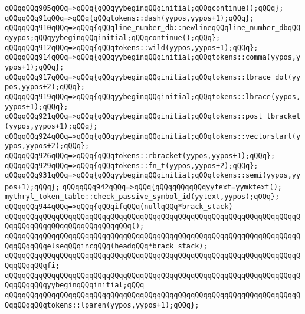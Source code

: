 \verb|qQQqqQQq905qQQq=>qQQq{qQQqyybeginqQQqinitial;qQQqcontinue();qQQq};|\newline
\verb|qQQqqQQq91qQQq=>qQQq{qQQqtokens::dash(yypos,yypos+1);qQQq};|\newline
\verb|qQQqqQQq910qQQq=>qQQq{qQQqline_number_db::newlineqQQqline_number_dbqQQqyypos;qQQqyybeginqQQqinitial;qQQqcontinue();qQQq};|\newline
\verb|qQQqqQQq912qQQq=>qQQq{qQQqtokens::wild(yypos,yypos+1);qQQq};|\newline
\verb|qQQqqQQq914qQQq=>qQQq{qQQqyybeginqQQqinitial;qQQqtokens::comma(yypos,yypos+1);qQQq};|\newline
\verb|qQQqqQQq917qQQq=>qQQq{qQQqyybeginqQQqinitial;qQQqtokens::lbrace_dot(yypos,yypos+2);qQQq};|\newline
\verb|qQQqqQQq919qQQq=>qQQq{qQQqyybeginqQQqinitial;qQQqtokens::lbrace(yypos,yypos+1);qQQq};|\newline
\verb|qQQqqQQq921qQQq=>qQQq{qQQqyybeginqQQqinitial;qQQqtokens::post_lbracket(yypos,yypos+1);qQQq};|\newline
\verb|qQQqqQQq924qQQq=>qQQq{qQQqyybeginqQQqinitial;qQQqtokens::vectorstart(yypos,yypos+2);qQQq};|\newline
\verb|qQQqqQQq926qQQq=>qQQq{qQQqtokens::rbracket(yypos,yypos+1);qQQq};|\newline
\verb|qQQqqQQq929qQQq=>qQQq{qQQqtokens::fn_t(yypos,yypos+2);qQQq};|\newline
\verb|qQQqqQQq931qQQq=>qQQq{qQQqyybeginqQQqinitial;qQQqtokens::semi(yypos,yypos+1);qQQq};|\newline
\verb|qQQqqQQq942qQQq=>qQQq{qQQqqQQqqQQqyytext=yymktext();|\newline
\verb|mythryl_token_table::check_passive_symbol_id(yytext,yypos);qQQq};|\newline
\verb|qQQqqQQq944qQQq=>qQQq{qQQqifqQQq(nullqQQq*brack_stack)|\newline
\verb|qQQqqQQqqQQqqQQqqQQqqQQqqQQqqQQqqQQqqQQqqQQqqQQqqQQqqQQqqQQqqQQqqQQqqQQqqQQqqQQqqQQqqQQqqQQqqQQqqQQq();|\newline
\verb|qQQqqQQqqQQqqQQqqQQqqQQqqQQqqQQqqQQqqQQqqQQqqQQqqQQqqQQqqQQqqQQqqQQqqQQqqQQqqQQqelseqQQqincqQQq(headqQQq*brack_stack);|\newline
\verb|qQQqqQQqqQQqqQQqqQQqqQQqqQQqqQQqqQQqqQQqqQQqqQQqqQQqqQQqqQQqqQQqqQQqqQQqqQQqqQQqfi;|\newline
\verb|qQQqqQQqqQQqqQQqqQQqqQQqqQQqqQQqqQQqqQQqqQQqqQQqqQQqqQQqqQQqqQQqqQQqqQQqqQQqqQQqyybeginqQQqinitial;qQQq|\newline
\verb|qQQqqQQqqQQqqQQqqQQqqQQqqQQqqQQqqQQqqQQqqQQqqQQqqQQqqQQqqQQqqQQqqQQqqQQqqQQqqQQqtokens::lparen(yypos,yypos+1);qQQq};|\newline
